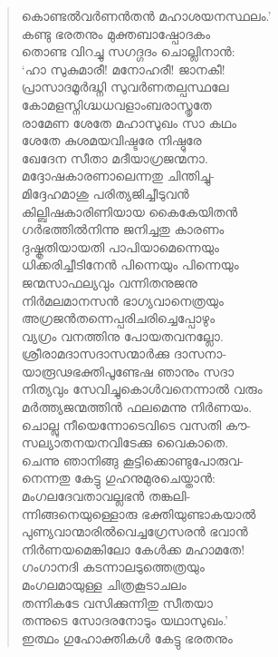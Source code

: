 \begin{verse}
കൊണ്ടല്‍വര്‍ണന്‍തന്‍ മഹാശയനസ്ഥലം.’\\
കണ്ടു ഭരതനും മുക്തബാഷ്പോദകം\\
തൊണ്ട വിറച്ചു സഗദ്ഗദം ചൊല്ലിനാന്‍:\\
‘ഹാ സുകുമാരീ! മനോഹരീ! ജാനകീ!\\
പ്രാസാദമൂര്‍ദ്ധ്നി സുവര്‍ണതല്പസ്ഥലേ\\
കോമളസ്നിഗ്ദ്ധധവളാംബരാസ്തൃതേ\\
രാമേണ ശേതേ മഹാസുഖം സാ കഥം\\
ശേതേ കുശമയവിഷ്ടരേ നിഷ്ഠുരേ\\
ഖേദേന സീതാ മദീയാഗ്രജന്മനാ.\\
മദ്ദോഷകാരണാലെന്നതു ചിന്തിച്ചു-\\
മിദ്ദേഹമാശു പരിത്യജിച്ചീടുവന്‍\\
കില്ബിഷകാരിണിയായ കൈകേയിതന്‍\\
ഗര്‍ഭത്തില്‍നിന്നു ജനിച്ചതു കാരണം\\
ദുഷ്കൃതിയായതി പാപിയാമെന്നെയും\\
ധിക്കരിച്ചീടിനേന്‍ പിന്നെയും പിന്നെയും\\
ജന്മസാഫല്യവും വന്നിതനുജനു\\
നിര്‍മലമാനസന്‍ ഭാഗ്യവാനെത്രയും\\
അഗ്രജന്‍തന്നെപ്പരിചരിച്ചെപ്പോഴും\\
വ്യഗ്രം വനത്തിനു പോയതവനല്ലോ.\\
ശ്രീരാമദാസദാസന്മാര്‍ക്കു ദാസനാ-\\
യാരൂഢഭക്തിപൂണ്ടേഷ ഞാനും സദാ\\
നിത്യവും സേവിച്ചുകൊള്‍വനെന്നാല്‍ വരും\\
മര്‍ത്ത്യജന്മത്തിന്‍ ഫലമെന്നു നിര്‍ണയം.\\
ചൊല്ലു നീയെന്നോടെവിടെ വസതി കൗ-\\
സല്യാതനയനവിടേക്കു വൈകാതെ.\\
ചെന്നു ഞാനിങ്ങു കൂട്ടിക്കൊണ്ടുപോരുവ-\\
നെന്നതു കേട്ടു ഗുഹനുമുരചെയ്താന്‍:\\
മംഗലദേവതാവല്ലഭന്‍ തങ്കലി-\\
ന്നിങ്ങനെയുള്ളൊരു ഭക്തിയുണ്ടാകയാല്‍\\
പുണ്യവാന്മാരില്‍വെച്ചഗ്രേസരന്‍ ഭവാന്‍\\
നിര്‍ണയമെങ്കിലോ കേള്‍ക്ക മഹാമതേ!\\
ഗംഗാനദി കടന്നാലടുത്തെത്രയും\\
മംഗലമായുള്ള ചിത്രകൂടാചലം\\
തന്നികടേ വസിക്കുന്നിതു സീതയാ\\
തന്നുടെ സോദരനോടും യഥാസുഖം.’\\
ഇത്ഥം ഗുഹോക്തികള്‍ കേട്ടു ഭരതനും\\

\end{verse}
